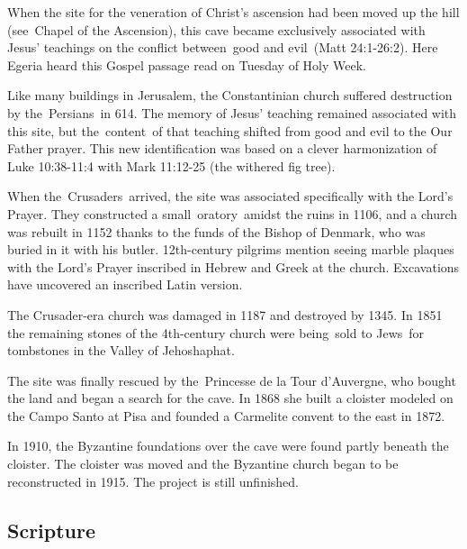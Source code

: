 \documentclass[letterpaper]{report}
\begin{document}
\begin{multicols}{2}
When the site for the veneration of Christ's ascension had been moved up the hill (see Chapel of the Ascension), this cave became exclusively associated with Jesus' teachings on the conflict between good and evil (Matt 24:1-26:2). Here Egeria heard this Gospel passage read on Tuesday of Holy Week.

Like many buildings in Jerusalem, the Constantinian church suffered destruction by the Persians in 614. The memory of Jesus' teaching remained associated with this site, but the content of that teaching shifted from good and evil to the Our Father prayer. This new identification was based on a clever harmonization of Luke 10:38-11:4 with Mark 11:12-25 (the withered fig tree).

When the Crusaders arrived, the site was associated specifically with the Lord's Prayer. They constructed a small oratory amidst the ruins in 1106, and a church was rebuilt in 1152 thanks to the funds of the Bishop of Denmark, who was buried in it with his butler. 12th-century pilgrims mention seeing marble plaques with the Lord's Prayer inscribed in Hebrew and Greek at the church. Excavations have uncovered an inscribed Latin version.

The Crusader-era church was damaged in 1187 and destroyed by 1345. In 1851 the remaining stones of the 4th-century church were being sold to Jews for tombstones in the Valley of Jehoshaphat.

The site was finally rescued by the Princesse de la Tour d'Auvergne, who bought the land and began a search for the cave. In 1868 she built a cloister modeled on the Campo Santo at Pisa and founded a Carmelite convent to the east in 1872.

In 1910, the Byzantine foundations over the cave were found partly beneath the cloister. The cloister was moved and the Byzantine church began to be reconstructed in 1915. The project is still unfinished.
\end{multicols}

\subsection{Scripture}
\end{document}
